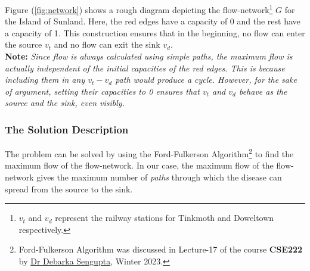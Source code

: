\documentclass[12pt]{report}
\begin{document}
    \vspace*{10pt} \linebreak
    Figure (\ref{fig:network}) shows a rough diagram depicting the flow-network\footnote{
        $v_{t}$ and $v_{d}$ represent the railway stations for Tinkmoth and Doweltown respectively.
    } $G$ for the Island of Sunland.
    Here, the red edges have a capacity of 0 and the rest have a capacity of 1.
    This construction ensures that in the beginning, no flow can enter the source $v_{t}$ and no flow can exit the sink $v_{d}$.
    \vspace*{10pt} \\
    \textbf{Note:} \textit{Since flow is always calculated using simple paths, the maximum flow is actually independent of the initial capacities of the red edges.
    This is because including them in any $v_{t}-v_{d}$ path would produce a cycle.
    However, for the sake of argument, setting their capacities to 0 ensures that $v_{t}$ and $v_{d}$ behave as the source and the sink, even visibly.}

    \subsubsection*{The Solution Description}
    The problem can be solved by using the Ford-Fulkerson Algorithm\footnote{
        Ford-Fulkerson Algorithm was discussed in Lecture-17 of the course \textbf{CSE222} by \href{mailto:debarka@iiitd.ac.in}{Dr Debarka Sengupta},
        Winter 2023.
    } to find the maximum flow of the flow-network.
    In our case, the maximum flow of the flow-network gives the maximum
    number of \textit{paths} through which the disease can spread from the source to the sink.
    \vspace*{10pt}
\end{document}
